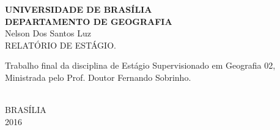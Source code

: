 \begin{titlepage}
    \begin{center}
        {\large \textbf{UNIVERSIDADE DE BRASÍLIA}} \\
        {\large \textbf{DEPARTAMENTO DE GEOGRAFIA}} \\[3.3cm]
        {\large Nelson Dos Santos Luz} \\[3.3cm]
        {\Huge RELATÓRIO DE ESTÁGIO.} \\[3.6cm]
        \hspace{.45\textwidth} %
        \begin{minipage}{.5\textwidth}
                Trabalho final da disciplina de Estágio Supervisionado em Geografia 02, Ministrada pelo Prof. Doutor Fernando Sobrinho.
        \end{minipage}\\[3.3cm]
        \vfill
        {\large BRASÍLIA} \\
        {\large 2016}
    \end{center}
\end{titlepage}